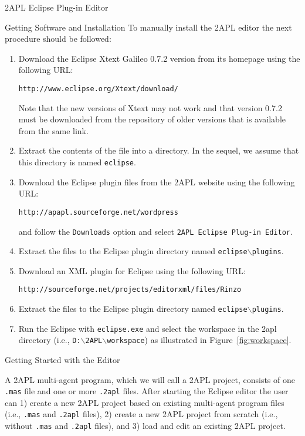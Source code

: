 \begin{chapter}{2APL Eclipse Plug-in Editor}
\begin{section}{Getting Software and Installation}
To manually install the 2APL editor the next procedure should be
followed:

\begin{enumerate}
   \item Download the Eclipse Xtext Galileo 0.7.2 version from its homepage using the following URL:
    \begin{center}
        {\tt http://www.eclipse.org/Xtext/download/}
    \end{center}
    Note that the new versions of Xtext may not work and that
    version 0.7.2 must be downloaded from the
    repository of older versions that is available from the same link.

    \item Extract the contents of the file into a directory. In the sequel, we assume that this directory is named {\tt eclipse}.

    \item Download the Eclipse plug\-in files from the 2APL website using the following URL:
    \begin{center}
    {\tt http://apapl.sourceforge.net/wordpress}
    \end{center}
    and follow the {\tt Downloads} option and select {\tt 2APL Eclipse Plug-in Editor}.

    \item Extract the files to the Eclipse plug\-in directory named {\tt eclipse$\backslash$plugins}.

    \item Download an XML plug\-in for Eclipse using the following URL:
    \begin{center}
    {\tt http://sourceforge.net/projects/editorxml/files/Rinzo}
    \end{center}

    \item Extract the files to the Eclipse plug\-in directory named
    {\tt eclipse$\backslash$plugins}.

    \item Run the Eclipse with \texttt{eclipse.exe} and select the workspace in the 2apl directory (i.e.,
    \texttt{D:$\backslash$2APL$\backslash$workspace}) as illustrated in
    Figure~\ref{fig:workspace}.
\end{enumerate}
\end{section}


\begin{section}{Getting Started with the Editor}

A 2APL multi-agent program, which we will call a 2APL project,
consists of one \texttt{.mas} file and one or more \texttt{.2apl}
files. After starting the Eclipse editor the user can 1) create a
new 2APL project based on existing multi-agent program files (i.e.,
\texttt{.mas} and \texttt{.2apl} files), 2) create a new 2APL
project from scratch (i.e., without \texttt{.mas} and \texttt{.2apl}
files), and 3) load and edit an existing 2APL project.


\end{section}
\end{chapter}
